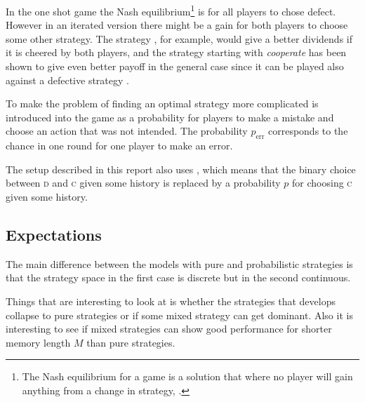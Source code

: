 In the one shot game the Nash equilibrium\footnote{The Nash equilibrium for a game is a solution that where no player will gain anything from a change in strategy, \cite{nash:1950}.} is for all players to chose defect. However in an iterated version there might be a gain for both players to choose some other strategy. The strategy , for example, would give a better dividends if it is cheered by both players, and the strategy  starting with \textit{cooperate} has been shown to give even better payoff in the general case since it can be played also against a defective strategy \cite{axelrod:1984}.\mypar

To make the problem of finding an optimal strategy more complicated  is introduced into the game as a probability for players to make a mistake and choose an action that was not intended. The probability $p_{\mathrm{err}}$ corresponds to the chance in one round for one player to make an error. %
\mypar

The setup described in this report also uses , which means that the binary choice between \textsc{d} and \textsc{c} given some history is replaced by a probability $p$ for choosing \textsc{c} given some history. %

\subsection{Expectations}
The main difference between the models with pure and probabilistic strategies is that the strategy space in the first case is discrete but in the second continuous.

Things that are interesting to look at is whether the strategies that develops collapse to pure strategies or if some mixed strategy can get dominant. Also it is interesting to see if mixed strategies can show good performance for shorter memory length $M$ than pure strategies.\mypar

